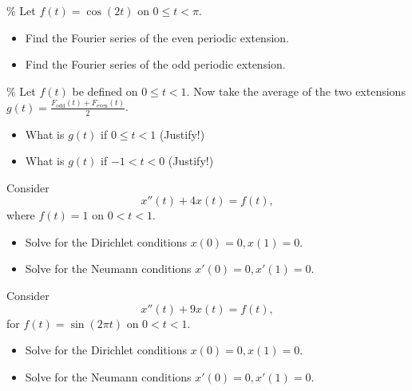 \documentclass{ximera}
\begin{document}
\begin{exercise}\%
    Let $f(t) = \cos(2t)$ on $0 \leq t < \pi$.
    \begin{itemize}
        \item Find the Fourier series of the even periodic extension.
        \item Find the Fourier series of the odd periodic extension.
    \end{itemize}
\end{exercise}

\begin{exercise}\%
    Let $f(t)$ be defined on $0 \leq t < 1$.  Now take the average of the two extensions $g(t) = \frac{F_{\text{odd}}(t)+ F_{\text{even}}(t)}{2}$.
    \begin{itemize}
        \item What is $g(t)$ if $0 \leq t < 1$ (Justify!)
        \item What is $g(t)$ if $-1 < t < 0$ (Justify!)
    \end{itemize}
\end{exercise}


\begin{exercise}
    Consider
    \begin{equation*}
        x''(t) + 4 x(t) = f(t) ,
    \end{equation*}
    where $f(t) = 1$ on $0 < t < 1$.
    \begin{itemize}
        \item Solve for the Dirichlet conditions $x(0)=0, x(1) = 0$.
        \item Solve for the Neumann conditions $x'(0)=0, x'(1) = 0$.
    \end{itemize}
\end{exercise}

\begin{exercise}
    Consider
    \begin{equation*}
        x''(t) + 9 x(t) = f(t) ,
    \end{equation*}
    for $f(t) = \sin (2\pi t)$ on $0 < t < 1$.
    \begin{itemize}
        \item Solve for the Dirichlet conditions $x(0)=0, x(1) = 0$.
        \item Solve for the Neumann conditions $x'(0)=0, x'(1) = 0$.
    \end{itemize}
\end{exercise}
\end{document}
